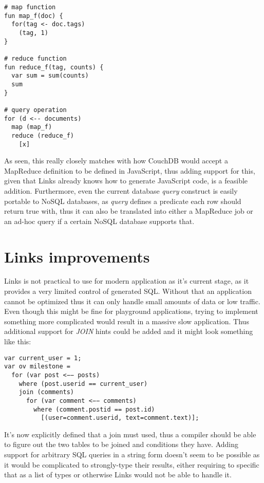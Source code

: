 \begin{codelisting}
\begin{verbatim}
# map function
fun map_f(doc) {
  for(tag <- doc.tags)
    (tag, 1)
}

# reduce function
fun reduce_f(tag, counts) {
  var sum = sum(counts)
  sum
}

# query operation
for (d <-- documents)
  map (map_f)
  reduce (reduce_f)
    [x]
\end{verbatim}
\end{codelisting}

As seen, this really closely matches with how CouchDB would accept a MapReduce definition to be defined in JavaScript, thus adding support for this, given that Links already knows how to generate JavaScript code, is a feasible addition. Furthermore, even the current database \textit{query} construct is easily portable to NoSQL databases, as \textit{query} defines a predicate each row should return true with, thus it can also be translated into either a MapReduce job or an ad-hoc query if a certain NoSQL database supports that.

\section{Links improvements}

Links is not practical to use for modern application as it's current stage, as it provides a very limited control of generated SQL. Without that an application cannot be optimized thus it can only handle small amounts of data or low traffic. Even though this might be fine for playground applications, trying to implement something more complicated would result in a massive slow application. Thus additional support for \textit{JOIN} hints could be added and it might look something like this:

\begin{codelisting}
\begin{verbatim}
var current_user = 1;
var ov milestone =
  for (var post <−− posts)
    where (post.userid == current_user)
    join (comments)
      for (var comment <−− comments)
        where (comment.postid == post.id)
          [(user=comment.userid, text=comment.text)];
\end{verbatim}
\end{codelisting}

It's now explicitly defined that a join must used, thus a compiler should be able to figure out the two tables to be joined and conditions they have. Adding support for arbitrary SQL queries in a string form doesn't seem to be possible as it would be complicated to strongly-type their results, either requiring to specific that as a list of types or otherwise Links would not be able to handle it.